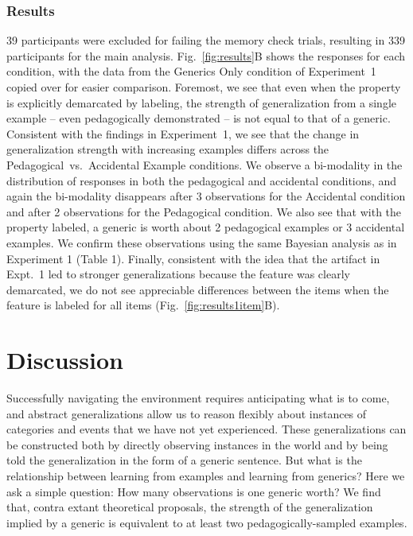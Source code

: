 \documentclass[10pt,letterpaper]{article}
\begin{document}
\subsubsection{Results}
39 participants were excluded for failing the memory check trials, resulting in 339 participants for the main analysis.
Fig.~\ref{fig:results}B shows the responses for each condition, with the data from the Generics Only condition of Experiment~1 copied over for easier comparison. 
Foremost, we see that even when the property is explicitly demarcated by labeling, the strength of generalization from a single example -- even pedagogically demonstrated -- is not equal to that of a generic. 
Consistent with the findings in Experiment~1, we see that the change in generalization strength with increasing examples differs across the Pedagogical~vs.~Accidental Example conditions. 
We observe a bi-modality in the distribution of responses in both the pedagogical and accidental conditions, and again the bi-modality disappears after 3 observations for the Accidental condition and after 2 observations for the Pedagogical condition. 
We also see that with the property labeled, a generic is worth about 2 pedagogical examples or 3 accidental examples. 
We confirm these observations using the same Bayesian analysis as in Experiment 1 (Table 1). 
Finally, consistent with the idea that the artifact in Expt.~1 led to stronger generalizations because the feature was clearly demarcated, we do not see appreciable differences between the items when the feature is labeled for all items (Fig.~\ref{fig:results1item}B).

\section{Discussion}

Successfully navigating the environment requires anticipating what is to come, and abstract generalizations allow us to reason flexibly about instances of categories and events that we have not yet experienced. 
These generalizations can be constructed both by directly observing instances in the world and by being told the generalization in the form of a generic sentence. 
But what is the relationship between learning from examples and learning from generics? 
Here we ask a simple question: How many observations is one generic worth?
We find that, contra extant theoretical proposals, the strength of the generalization implied by a generic is equivalent to at least two pedagogically-sampled examples. 
\end{document}
